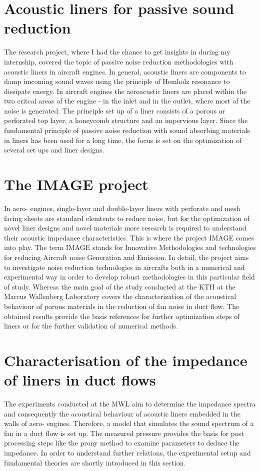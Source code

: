 \documentclass[11pt]{report} %
\begin{document}
\section{Acoustic liners for passive sound reduction}
The research project, where I had the chance to get insights in during my internship, covered the topic of passive noise reduction methodologies with acoustic liners in aircraft engines.
In general, acoustic liners are components to damp imcoming sound waves using the principle of Hemholz resonance to dissipate energy.
In aircraft engines the aeroacustic liners are placed within the two critcal areas of the engine - in the inlet and in the outlet, where most of the noise is generated. 	 
The principle set up of a liner consists of a porous or perforated top layer, a honeycomb structure and an impervious layer. 
Since the fundamental principle of passive noise reduction with sound absorbing materials in liners has been used for a long time, the focus is set on the optimization of several set ups and liner designs.


\section{The IMAGE project} 
In aero- engines, single-layer and double-layer liners with perforate and mesh facing sheets are standard elemtents to reduce noise, but for the optimization of novel liner designs and novel materials more research is required to understand their acoustic impedance characteristics.
This is where the project IMAGE comes into play.
The term IMAGE stands for Innovative Methodologies and technologies for reducing Aircraft noise Generation and Emission.
In detail, the project aims to investigate noise reduction technologies in aircrafts both in a numerical and experimental way in order to develop robust methodologies in this particular field of study.  
Whereas the main goal of the study conducted at the KTH at the Marcus Wallenberg Laboratory covers the characterization of the acoustical behaviour of porous materials in the reduction of fan noise in duct flow. 
The obtained results provide the  basis references for further optimization steps of liners or for the further validation of numerical methods. 

\section{Characterisation of the impedance of liners in duct flows}
The experiments conducted at the MWL aim to determine the impedance spectra and consequently the acoustical behaviour of acoustic liners embedded in the walls of aero- engines.
Therefore, a model that simulates the sound spectrum of a fan in a duct flow is set up. 
The measured pressure provides the basis for post processing steps like the prony method to examine parameters to deduce the impedance.
In order to understand further relations, the experimental setup and fundamental theories are shortly introduced in this section. 
\end{document}
